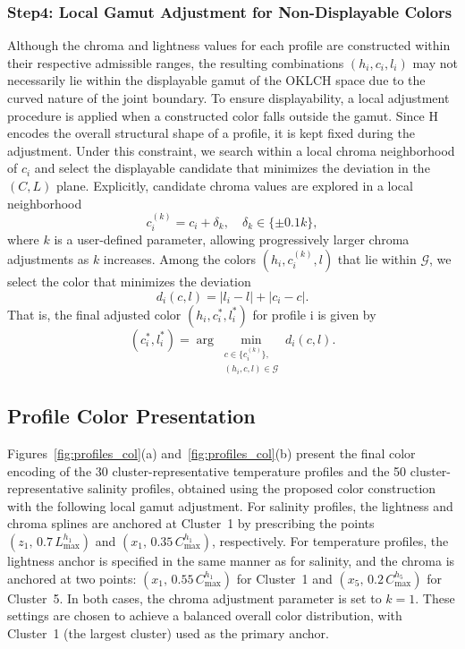 \documentclass[11pt]{article}
\theoremstyle{plain}
\begin{document}
\subsubsection*{Step4: Local Gamut Adjustment for Non-Displayable Colors}
Although the chroma and lightness values for each profile are constructed within their respective admissible ranges, the resulting combinations $(h_i, c_i, l_i)$ may not necessarily lie within the displayable gamut of the OKLCH space due to the curved nature of the joint boundary. To ensure displayability, a local adjustment procedure is applied when a constructed color falls outside the gamut. Since H encodes the overall structural shape of a profile, it is kept fixed during the adjustment. Under this constraint, we search within a local chroma neighborhood of $c_i$ and select the displayable candidate that minimizes the deviation in the $(C,L)$ plane. Explicitly, candidate chroma values are explored in a local neighborhood
\[
c_i^{(k)} = c_i + \delta_k, \quad \delta_k \in \{\pm 0.1k\},
\]
where $k$ is a user-defined parameter, allowing progressively larger chroma adjustments as 
$k$ increases. Among the colors $(h_i, c_i^{(k)}, l)$ that lie within $\mathcal{G}$, 
we select the color that minimizes the deviation
\[
d_i(c,l) = |l_i - l| + |c_i - c|.
\]
That is, the final adjusted color $(h_i, c_i^*, l_i^*)$ for profile i is given by
\[
(c_i^*, l_i^*) 
= \arg\min_{\substack{c \in \{c_i^{(k)}\}, \\ (h_i, c, l) \in \mathcal{G}}}
d_i(c,l).
\]

\subsection{Profile Color Presentation}
Figures~\ref{fig:profiles_col}(a) and~\ref{fig:profiles_col}(b) present the final color encoding of the 30 cluster-representative temperature profiles and the 50 cluster-representative salinity profiles, obtained using the proposed color construction with the following local gamut adjustment. For salinity profiles, the lightness and chroma splines are anchored at Cluster~1 by prescribing the points $(z_1,\, 0.7\,L_{\max}^{h_1})$ and $(x_1,\, 0.35\,C_{\max}^{h_1})$, respectively. For temperature profiles, the lightness anchor is specified in the same manner as for salinity, and the chroma is anchored at two points: $(x_1,\, 0.55\,C_{\max}^{h_1})$ for Cluster~1 and $(x_5,\, 0.2\,C_{\max}^{h_5})$ for Cluster~5. In both cases, the chroma adjustment parameter is set to $k=1$. These settings are chosen to achieve a balanced overall color distribution, with Cluster~1 (the largest cluster) used as the primary anchor. 
\end{document}

